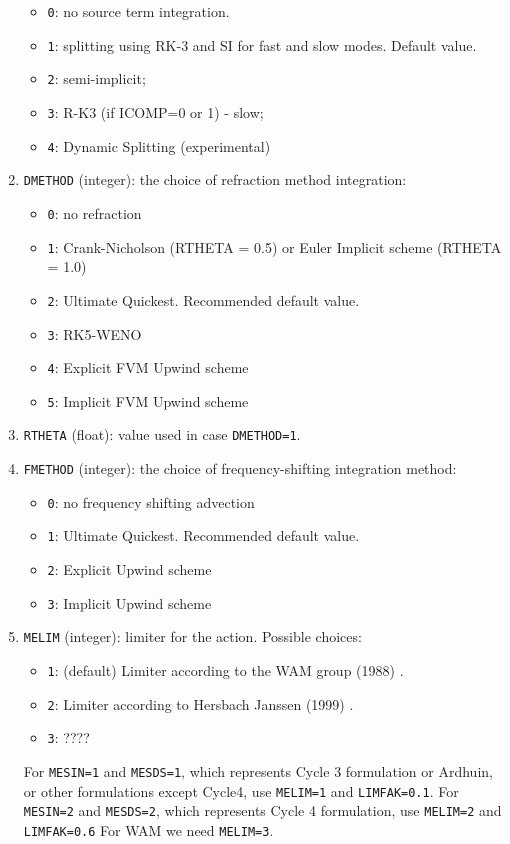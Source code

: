 \documentclass[12pt]{amsart}
\begin{document}
\begin{enumerate}
  \begin{itemize}
  \item {\tt 0}: no source term integration.
  \item {\tt 1}: splitting using RK-3 and SI for fast and slow modes. Default value.
  \item {\tt 2}: semi-implicit;
  \item {\tt 3}: R-K3 (if ICOMP=0 or 1) - slow;
  \item {\tt 4}: Dynamic Splitting (experimental)
  \end{itemize}
\item {\tt DMETHOD} (integer): the choice of refraction method integration:
  \begin{itemize}
  \item {\tt 0}: no refraction
  \item {\tt 1}: Crank-Nicholson (RTHETA = 0.5) or Euler Implicit scheme (RTHETA = 1.0)
  \item {\tt 2}: Ultimate Quickest. Recommended default value.
  \item {\tt 3}: RK5-WENO
  \item {\tt 4}: Explicit FVM Upwind scheme
  \item {\tt 5}: Implicit FVM Upwind scheme
  \end{itemize}
\item {\tt RTHETA} (float): value used in case {\tt DMETHOD=1}.
\item {\tt FMETHOD} (integer): the choice of frequency-shifting integration method:
  \begin{itemize}
  \item {\tt 0}: no frequency shifting advection
  \item {\tt 1}: Ultimate Quickest. Recommended default value.
  \item {\tt 2}: Explicit Upwind scheme
  \item {\tt 3}: Implicit Upwind scheme
  \end{itemize}
\item {\tt MELIM} (integer): limiter for the action. Possible choices:
  \begin{itemize}
  \item {\tt 1}: (default) Limiter according to the WAM group (1988) \cite{WAMDIgroup}.
  \item {\tt 2}: Limiter according to Hersbach Janssen (1999) \cite{HersbachJanssen}.
  \item {\tt 3}: ????
  \end{itemize}
For {\tt MESIN=1} and {\tt MESDS=1}, which represents Cycle 3 formulation or Ardhuin,
or other formulations except Cycle4, use {\tt MELIM=1} and {\tt LIMFAK=0.1}.
For {\tt MESIN=2} and {\tt MESDS=2}, which represents Cycle 4 formulation, use {\tt MELIM=2} and {\tt LIMFAK=0.6}
For WAM we need {\tt MELIM=3}.
    
\end{enumerate}
\end{document}
